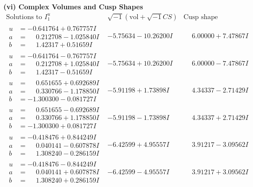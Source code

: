 \documentclass[1p]{elsarticle_modified}
\theoremstyle{definition}
\newcommand{\I}{\sqrt{-1}}
\begin{document}
\newpage\flushleft \textbf{(vi) Complex Volumes and Cusp Shapes}
$$\begin{array}{c|c|c}  
\text{Solutions to }I^u_{1}& \I (\text{vol} + \sqrt{-1}CS) & \text{Cusp shape}\\
 \hline 
\begin{aligned}
u &= -0.641764 + 0.767757 I \\
a &= \phantom{-}0.212708 - 1.025840 I \\
b &= \phantom{-}1.42317 + 0.51659 I\end{aligned}
 & -5.75634 - 10.26200 I & \phantom{-}6.00000 + 7.47867 I \\ \hline\begin{aligned}
u &= -0.641764 - 0.767757 I \\
a &= \phantom{-}0.212708 + 1.025840 I \\
b &= \phantom{-}1.42317 - 0.51659 I\end{aligned}
 & -5.75634 + 10.26200 I & \phantom{-}6.00000 - 7.47867 I \\ \hline\begin{aligned}
u &= \phantom{-}0.651655 + 0.692689 I \\
a &= \phantom{-}0.330766 - 1.178850 I \\
b &= -1.300300 - 0.081727 I\end{aligned}
 & -5.91198 + 1.73898 I & \phantom{-}4.34337 - 2.71429 I \\ \hline\begin{aligned}
u &= \phantom{-}0.651655 - 0.692689 I \\
a &= \phantom{-}0.330766 + 1.178850 I \\
b &= -1.300300 + 0.081727 I\end{aligned}
 & -5.91198 - 1.73898 I & \phantom{-}4.34337 + 2.71429 I \\ \hline\begin{aligned}
u &= -0.418476 + 0.844249 I \\
a &= \phantom{-}0.040141 - 0.607878 I \\
b &= \phantom{-}1.308240 - 0.286159 I\end{aligned}
 & -6.42599 + 4.95557 I & \phantom{-}3.91217 - 3.09562 I \\ \hline\begin{aligned}
u &= -0.418476 - 0.844249 I \\
a &= \phantom{-}0.040141 + 0.607878 I \\
b &= \phantom{-}1.308240 + 0.286159 I\end{aligned}
 & -6.42599 - 4.95557 I & \phantom{-}3.91217 + 3.09562 I \\ \hline\begin{aligned}

\end{aligned}
\end{array}$$
\end{document}
